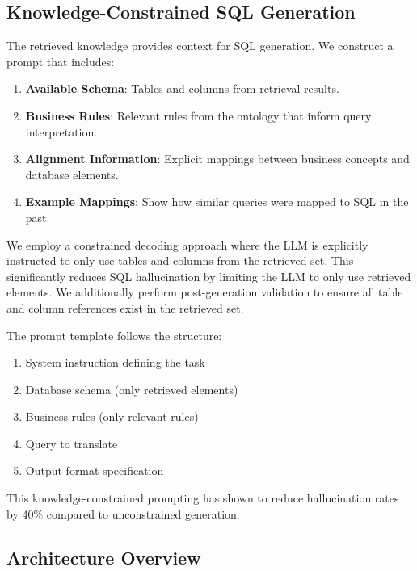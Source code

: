 \documentclass[sigconf, nonatbib]{acmart}
\begin{document}
\subsection{Knowledge-Constrained SQL Generation}

The retrieved knowledge provides context for SQL generation. We construct a prompt that includes:

\begin{enumerate}
    \item \textbf{Available Schema}: Tables and columns from retrieval results.
    
    \item \textbf{Business Rules}: Relevant rules from the ontology that inform query interpretation.
    
    \item \textbf{Alignment Information}: Explicit mappings between business concepts and database elements.
    
    \item \textbf{Example Mappings}: Show how similar queries were mapped to SQL in the past.
\end{enumerate}

We employ a constrained decoding approach where the LLM is explicitly instructed to only use tables and columns from the retrieved set. This significantly reduces SQL hallucination by limiting the LLM to only use retrieved elements. We additionally perform post-generation validation to ensure all table and column references exist in the retrieved set.

The prompt template follows the structure:
\begin{enumerate}
    \item System instruction defining the task
    \item Database schema (only retrieved elements)
    \item Business rules (only relevant rules)
    \item Query to translate
    \item Output format specification
\end{enumerate}

This knowledge-constrained prompting has shown to reduce hallucination rates by 40\% compared to unconstrained generation.

\subsection{Architecture Overview}
\end{document}
